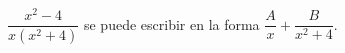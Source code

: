 \item $\dfrac{x^2 - 4}{x(x^2 + 4)}$ se puede escribir en la forma $\dfrac{A}{x} + \dfrac{B}{x^2 + 4}$.
